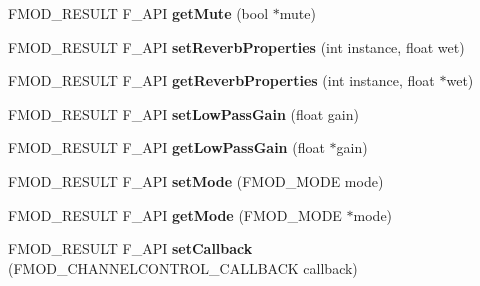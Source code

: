 \begin{DoxyCompactItemize}
\item 
\hypertarget{class_f_m_o_d_1_1_channel_control_a95c7ac113ca640ed42a6ecfb9f02ac72}{F\+M\+O\+D\+\_\+\+R\+E\+S\+U\+L\+T F\+\_\+\+A\+P\+I {\bfseries get\+Mute} (bool $\ast$mute)}\label{class_f_m_o_d_1_1_channel_control_a95c7ac113ca640ed42a6ecfb9f02ac72}

\item 
\hypertarget{class_f_m_o_d_1_1_channel_control_aa4ac7ea773a9c1c0008859d2fd54e168}{F\+M\+O\+D\+\_\+\+R\+E\+S\+U\+L\+T F\+\_\+\+A\+P\+I {\bfseries set\+Reverb\+Properties} (int instance, float wet)}\label{class_f_m_o_d_1_1_channel_control_aa4ac7ea773a9c1c0008859d2fd54e168}

\item 
\hypertarget{class_f_m_o_d_1_1_channel_control_abf0c86eaa2826416a84e1114978f6d63}{F\+M\+O\+D\+\_\+\+R\+E\+S\+U\+L\+T F\+\_\+\+A\+P\+I {\bfseries get\+Reverb\+Properties} (int instance, float $\ast$wet)}\label{class_f_m_o_d_1_1_channel_control_abf0c86eaa2826416a84e1114978f6d63}

\item 
\hypertarget{class_f_m_o_d_1_1_channel_control_a3f4659365019871bb8ab4dc3e789d011}{F\+M\+O\+D\+\_\+\+R\+E\+S\+U\+L\+T F\+\_\+\+A\+P\+I {\bfseries set\+Low\+Pass\+Gain} (float gain)}\label{class_f_m_o_d_1_1_channel_control_a3f4659365019871bb8ab4dc3e789d011}

\item 
\hypertarget{class_f_m_o_d_1_1_channel_control_abb54e1684b1392e44b22692ee434e20f}{F\+M\+O\+D\+\_\+\+R\+E\+S\+U\+L\+T F\+\_\+\+A\+P\+I {\bfseries get\+Low\+Pass\+Gain} (float $\ast$gain)}\label{class_f_m_o_d_1_1_channel_control_abb54e1684b1392e44b22692ee434e20f}

\item 
\hypertarget{class_f_m_o_d_1_1_channel_control_a8322277ea91a5468d2515685648229eb}{F\+M\+O\+D\+\_\+\+R\+E\+S\+U\+L\+T F\+\_\+\+A\+P\+I {\bfseries set\+Mode} (F\+M\+O\+D\+\_\+\+M\+O\+D\+E mode)}\label{class_f_m_o_d_1_1_channel_control_a8322277ea91a5468d2515685648229eb}

\item 
\hypertarget{class_f_m_o_d_1_1_channel_control_abda2185be172412ca5dc8b33629ecf2c}{F\+M\+O\+D\+\_\+\+R\+E\+S\+U\+L\+T F\+\_\+\+A\+P\+I {\bfseries get\+Mode} (F\+M\+O\+D\+\_\+\+M\+O\+D\+E $\ast$mode)}\label{class_f_m_o_d_1_1_channel_control_abda2185be172412ca5dc8b33629ecf2c}

\item 
\hypertarget{class_f_m_o_d_1_1_channel_control_a987b936c38877c520259afa3cf2cb78e}{F\+M\+O\+D\+\_\+\+R\+E\+S\+U\+L\+T F\+\_\+\+A\+P\+I {\bfseries set\+Callback} (F\+M\+O\+D\+\_\+\+C\+H\+A\+N\+N\+E\+L\+C\+O\+N\+T\+R\+O\+L\+\_\+\+C\+A\+L\+L\+B\+A\+C\+K callback)}\label{class_f_m_o_d_1_1_channel_control_a987b936c38877c520259afa3cf2cb78e}


\end{DoxyCompactItemize}
